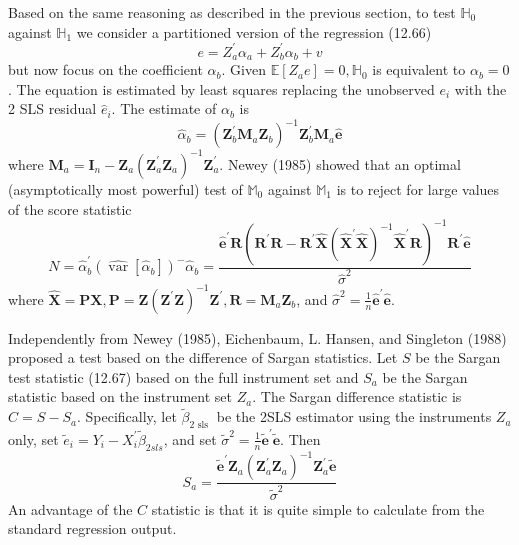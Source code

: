 \documentclass[10pt]{article}
\begin{document}
Based on the same reasoning as described in the previous section, to test $\mathbb{H}_{0}$ against $\mathbb{H}_{1}$ we consider a partitioned version of the regression (12.66)
$$
e=Z_{a}^{\prime} \alpha_{a}+Z_{b}^{\prime} \alpha_{b}+v
$$
but now focus on the coefficient $\alpha_{b}$. Given $\mathbb{E}\left[Z_{a} e\right]=0, \mathbb{H}_{0}$ is equivalent to $\alpha_{b}=0$. The equation is estimated by least squares replacing the unobserved $e_{i}$ with the 2 SLS residual $\widehat{e}_{i}$. The estimate of $\alpha_{b}$ is
$$
\widehat{\alpha}_{b}=\left(\boldsymbol{Z}_{b}^{\prime} \boldsymbol{M}_{a} \boldsymbol{Z}_{b}\right)^{-1} \boldsymbol{Z}_{b}^{\prime} \boldsymbol{M}_{a} \widehat{\boldsymbol{e}}
$$
where $\boldsymbol{M}_{a}=\boldsymbol{I}_{n}-\boldsymbol{Z}_{a}\left(\boldsymbol{Z}_{a}^{\prime} \boldsymbol{Z}_{a}\right)^{-1} \boldsymbol{Z}_{a}^{\prime}$. Newey (1985) showed that an optimal (asymptotically most powerful) test of $\mathbb{M}_{0}$ against $\mathbb{M}_{1}$ is to reject for large values of the score statistic
$$
N=\widehat{\alpha}_{b}^{\prime}\left(\widehat{\operatorname{var}}\left[\widehat{\alpha}_{b}\right]\right)^{-} \widehat{\alpha}_{b}=\frac{\widehat{\boldsymbol{e}}^{\prime} \boldsymbol{R}\left(\boldsymbol{R}^{\prime} \boldsymbol{R}-\boldsymbol{R}^{\prime} \widehat{\boldsymbol{X}}\left(\widehat{\boldsymbol{X}}^{\prime} \widehat{\boldsymbol{X}}\right)^{-1} \widehat{\boldsymbol{X}}^{\prime} \boldsymbol{R}\right)^{-1} \boldsymbol{R}^{\prime} \widehat{\boldsymbol{e}}}{\widehat{\sigma}^{2}}
$$
where $\widehat{\boldsymbol{X}}=\boldsymbol{P} \boldsymbol{X}, \boldsymbol{P}=\boldsymbol{Z}\left(\boldsymbol{Z}^{\prime} \boldsymbol{Z}\right)^{-1} \boldsymbol{Z}^{\prime}, \boldsymbol{R}=\boldsymbol{M}_{a} \boldsymbol{Z}_{b}$, and $\widehat{\sigma}^{2}=\frac{1}{n} \widehat{\boldsymbol{e}}^{\prime} \widehat{\boldsymbol{e}}$.

Independently from Newey (1985), Eichenbaum, L. Hansen, and Singleton (1988) proposed a test based on the difference of Sargan statistics. Let $S$ be the Sargan test statistic (12.67) based on the full instrument set and $S_{a}$ be the Sargan statistic based on the instrument set $Z_{a}$. The Sargan difference statistic is $C=S-S_{a}$. Specifically, let $\widetilde{\beta}_{2 \text { sls }}$ be the 2SLS estimator using the instruments $Z_{a}$ only, set $\widetilde{e}_{i}=Y_{i}-X_{i}^{\prime} \widetilde{\beta}_{2 s l s}$, and set $\widetilde{\sigma}^{2}=\frac{1}{n} \widetilde{\boldsymbol{e}}^{\prime} \widetilde{\boldsymbol{e}}$. Then
$$
S_{a}=\frac{\widetilde{\boldsymbol{e}}^{\prime} \boldsymbol{Z}_{a}\left(\boldsymbol{Z}_{a}^{\prime} \boldsymbol{Z}_{a}\right)^{-1} \boldsymbol{Z}_{a}^{\prime} \widetilde{\boldsymbol{e}}}{\widetilde{\sigma}^{2}}
$$
An advantage of the $C$ statistic is that it is quite simple to calculate from the standard regression output.
\end{document}

